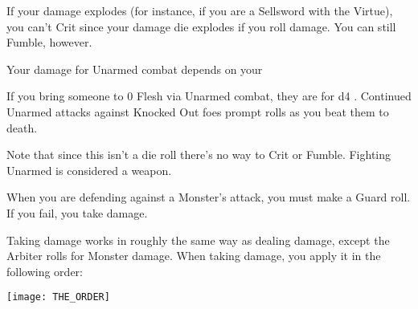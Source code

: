 {\newpage


  If your damage explodes (for instance, if you are a Sellsword with the  Virtue), you can't Crit since your damage die explodes if you roll \MAX damage.  You can still Fumble, however.



  Your damage for Unarmed combat depends on your \VIG


  If you bring someone to 0 Flesh via Unarmed combat, they are  for d4 .  Continued Unarmed attacks against Knocked Out foes prompt \DEATH rolls as you beat them to death.

  Note that since this isn't a die roll there's no way to Crit or Fumble.  Fighting Unarmed is considered a  weapon.





  When you are defending against a Monster's attack, you must make a Guard roll.  If you fail, you take damage.


  Taking damage works in roughly the same way as dealing damage, except the Arbiter rolls for Monster damage.    When taking damage, you apply it in the following order:

  \begin{center}
  \texttt{[image: THE\_ORDER]}
  \end{center}

}

